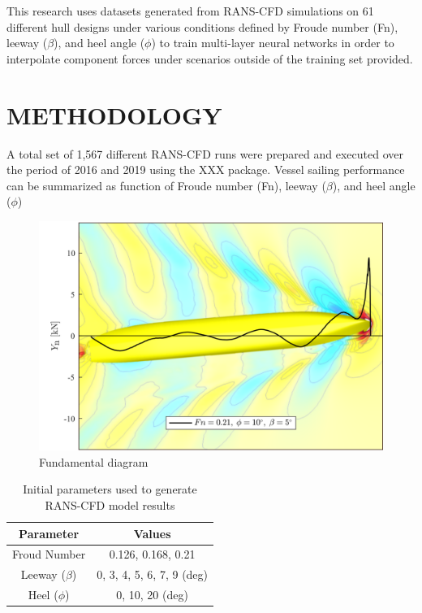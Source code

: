 \documentclass[10pt,a4paper,twocolumn]{article}
\begin{document}
This research uses datasets generated from RANS-CFD simulations on 61 different hull designs under various conditions defined by Froude number (Fn), leeway ($\beta$), and heel angle ($\phi$) to train multi-layer neural networks in order to interpolate component forces under scenarios outside of the training set provided. 


 
\section{METHODOLOGY}

A total set of 1,567 different RANS-CFD runs were prepared and executed over the period of 2016 and 2019 using the XXX package. 
Vessel sailing performance can be summarized as function of Froude number (Fn), leeway ($\beta$), and heel angle ($\phi$)

\begin{figure}[]
\centering
\includegraphics[width=\columnwidth]{images/hull1.png}  %
\caption{Fundamental diagram }
\label{fig:hull1}
\end{figure}


\begin{table}[]
\centering
\caption{Initial parameters used to generate RANS-CFD model results}
\label{tab:parameters}
\begin{tabular}{@{}cc@{}}
\toprule
\textbf{Parameter} & \textbf{Values} \\ \midrule
Froud Number & 0.126, 0.168, 0.21 \\
Leeway ($\beta$) & 0, 3, 4, 5, 6, 7, 9 (deg) \\
Heel ($\phi$) & 0, 10, 20 (deg) \\ \bottomrule
\end{tabular}
\end{table}
\end{document}
